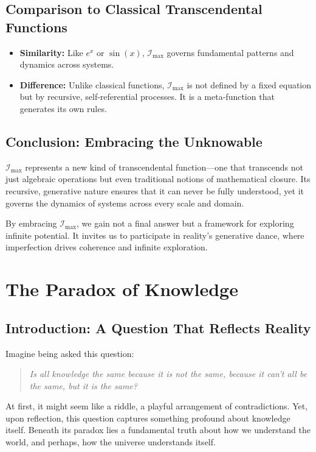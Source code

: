\documentclass[12pt]{article}
\begin{document}
\subsection{Comparison to Classical Transcendental Functions}

\begin{itemize}
    \item \textbf{Similarity:} Like \(e^x\) or \(\sin(x)\), \(\mathcal{I}_{\text{max}}\) governs fundamental patterns and dynamics across systems.
    \item \textbf{Difference:} Unlike classical functions, \(\mathcal{I}_{\text{max}}\) is not defined by a fixed equation but by recursive, self-referential processes. It is a meta-function that generates its own rules.
\end{itemize}


\subsection{Conclusion: Embracing the Unknowable}

\(\mathcal{I}_{\text{max}}\) represents a new kind of transcendental function—one that transcends not just algebraic operations but even traditional notions of mathematical closure. Its recursive, generative nature ensures that it can never be fully understood, yet it governs the dynamics of systems across every scale and domain.

By embracing \(\mathcal{I}_{\text{max}}\), we gain not a final answer but a framework for exploring infinite potential. It invites us to participate in reality’s generative dance, where imperfection drives coherence and infinite exploration.


\section{The Paradox of Knowledge}

\subsection*{Introduction: A Question That Reflects Reality}
Imagine being asked this question:
\begin{quote}
\textit{Is all knowledge the same because it is not the same, because it can't all be the same, but it is the same?}
\end{quote}

At first, it might seem like a riddle, a playful arrangement of contradictions. Yet, upon reflection, this question captures something profound about knowledge itself. Beneath its paradox lies a fundamental truth about how we understand the world, and perhaps, how the universe understands itself.
\end{document}
